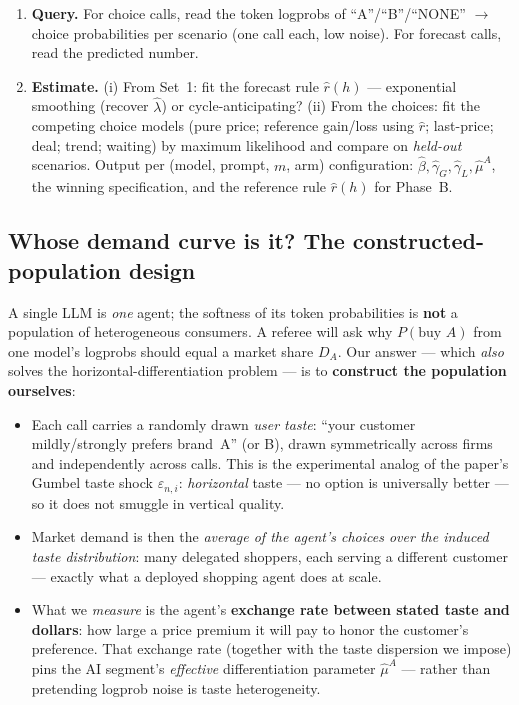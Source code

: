 \documentclass[11pt]{article}
\begin{document}
\begin{enumerate}[label=\textbf{Step \arabic*.},leftmargin=2.1cm]
        choices.
  \item \textbf{Query.} For choice calls, read the token logprobs of ``A''/``B''/``NONE'' $\to$ choice
        probabilities per scenario (one call each, low noise). For forecast calls, read the predicted
        number.
  \item \textbf{Estimate.} (i) From Set~1: fit the forecast rule $\hat r(h)$ --- exponential smoothing
        (recover $\hat\lambda$) or cycle-anticipating? (ii) From the choices: fit the competing choice
        models (pure price; reference gain/loss using $\hat r$; last-price; deal; trend; waiting) by
        maximum likelihood and compare on \emph{held-out} scenarios. Output per (model, prompt, $m$, arm)
        configuration: $\hat\beta,\hat\gamma_G,\hat\gamma_L,\hat\mu^{A}$, the winning specification, and
        the reference rule $\hat r(h)$ for Phase~B.
\end{enumerate}

\subsection*{Whose demand curve is it? The constructed-population design}

A single LLM is \emph{one} agent; the softness of its token probabilities is \textbf{not} a population of
heterogeneous consumers. A referee will ask why $P(\text{buy }A)$ from one model's logprobs should equal a
market share $D_A$. Our answer --- which \emph{also} solves the horizontal-differentiation problem --- is to
\textbf{construct the population ourselves}:

\begin{itemize}\setlength\itemsep{2pt}
  \item Each call carries a randomly drawn \emph{user taste}: ``your customer mildly/strongly prefers
        brand~A'' (or B), drawn symmetrically across firms and independently across calls. This is the
        experimental analog of the paper's Gumbel taste shock $\varepsilon_{n,i}$: \emph{horizontal} taste
        --- no option is universally better --- so it does not smuggle in vertical quality.
  \item Market demand is then the \emph{average of the agent's choices over the induced taste
        distribution}: many delegated shoppers, each serving a different customer --- exactly what a
        deployed shopping agent does at scale.
  \item What we \emph{measure} is the agent's \textbf{exchange rate between stated taste and dollars}: how
        large a price premium it will pay to honor the customer's preference. That exchange rate (together
        with the taste dispersion we impose) pins the AI segment's \emph{effective} differentiation
        parameter $\hat\mu^{A}$ --- rather than pretending logprob noise is taste heterogeneity.
\end{itemize}
\end{document}
